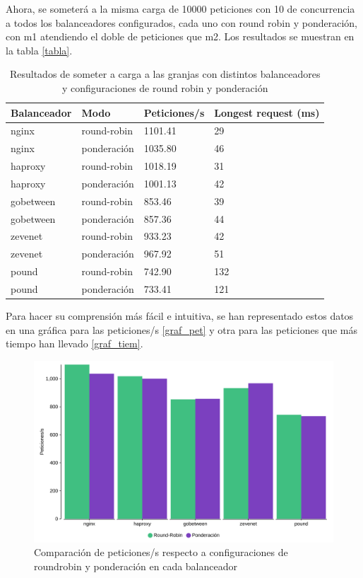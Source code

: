 Ahora, se someterá a la misma carga de 10000 peticiones con 10 de concurrencia a todos los balanceadores configurados, cada uno con round robin y ponderación, con m1 atendiendo el doble de peticiones que m2. Los resultados se muestran en la tabla \eqref{tabla}.

\begin{table}[!ht]
\caption{Resultados de someter a carga a las granjas con distintos balanceadores y configuraciones de round robin y ponderación}
    \centering
    \begin{tabular}{|l|l|l|l|}
    \hline
        Balanceador & Modo & Peticiones/s & Longest request (ms) \\ \hline
        nginx & round-robin & 1101.41 & 29 \\ \hline
        nginx & ponderación & 1035.80 & 46 \\ \hline
        haproxy & round-robin & 1018.19 & 31 \\ \hline
        haproxy & ponderación & 1001.13 & 42 \\ \hline
        gobetween & round-robin & 853.46 & 39 \\ \hline
        gobetween & ponderación & 857.36 & 44 \\ \hline
        zevenet & round-robin & 933.23 & 42 \\ \hline
        zevenet & ponderación & 967.92 & 51 \\ \hline
        pound & round-robin & 742.90 & 132 \\ \hline
        pound & ponderación & 733.41 & 121 \\ \hline
    \end{tabular}
\label{tabla}
\end{table}

Para hacer su comprensión más fácil e intuitiva, se han representado estos datos en una gráfica para las peticiones/s \eqref{graf_pet} y otra para las peticiones que más tiempo han llevado \eqref{graf_tiem}.

\begin{figure}[h!]
\begin{center}
\caption{Comparación de peticiones/s respecto a configuraciones de roundrobin y ponderación en cada balanceador}
\label{graf_pet}
\includegraphics[scale=0.05]{peticioness}
\end{center}
\end{figure}

